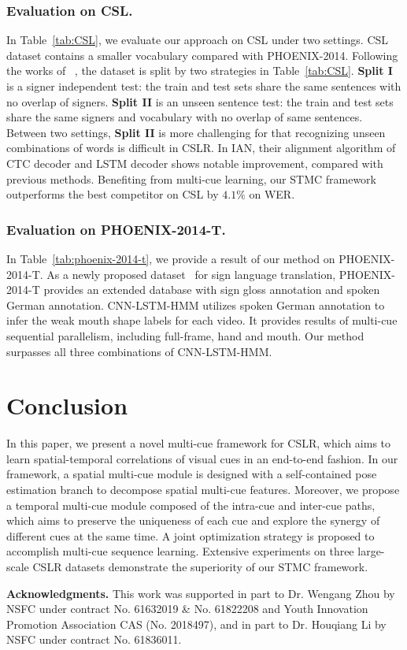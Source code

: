 \documentclass[letterpaper]{article} \usepackage{aaai20}  \usepackage{times}  \usepackage{helvet} \usepackage{courier}  \usepackage[hyphens]{url}  \usepackage{graphicx} \urlstyle{rm} \def\UrlFont{\rm}  \usepackage{graphicx}  \frenchspacing  \setlength{\pdfpagewidth}{8.5in}  \setlength{\pdfpageheight}{11in}
\begin{document}
\subsubsection{Evaluation on CSL.} In Table~\ref{tab:CSL}, we evaluate our approach on CSL under two settings. CSL dataset contains a smaller vocabulary compared with PHOENIX-2014. Following the works of ~\cite{han,hlstm}, the dataset is split by two strategies in Table~\ref{tab:CSL}. \textbf{Split I} is a signer independent test: the train and test sets share the same sentences with no overlap of signers. \textbf{Split II} is an unseen sentence test: the train and test sets share the same signers and vocabulary with no overlap of same sentences. Between two settings, \textbf{Split II} is more challenging for that recognizing unseen combinations of words is difficult in CSLR. In IAN, their alignment algorithm of CTC decoder and LSTM decoder shows notable improvement, compared with previous methods. Benefiting from multi-cue learning, our STMC framework outperforms the best competitor on CSL by $4.1\%$ on WER.

\subsubsection{Evaluation on PHOENIX-2014-T.} In Table~\ref{tab:phoenix-2014-t}, we provide a result of our method on PHOENIX-2014-T. As a newly proposed dataset~\cite{phoenix2014t} for sign language translation, PHOENIX-2014-T provides an extended database with sign gloss annotation and spoken German annotation. CNN-LSTM-HMM utilizes spoken German annotation to infer the weak mouth shape labels for each video. It provides results of multi-cue sequential parallelism, including full-frame, hand and mouth. Our method surpasses all three combinations of CNN-LSTM-HMM.

\section{Conclusion}
In this paper, we present a novel multi-cue framework for CSLR, which aims to learn spatial-temporal correlations of visual cues in an end-to-end fashion. In our framework, a spatial multi-cue module is designed with a self-contained pose estimation branch to decompose spatial multi-cue features. Moreover, we propose a temporal multi-cue module composed of the intra-cue and inter-cue paths, which aims to preserve the uniqueness of each cue and explore the synergy of different cues at the same time. A joint optimization strategy is proposed to accomplish multi-cue sequence learning. Extensive experiments on three large-scale CSLR datasets demonstrate the superiority of our STMC framework.

{\bf Acknowledgments.} This work was supported in part to Dr. Wengang Zhou by NSFC under contract No. 61632019 \& No. 61822208 and Youth Innovation Promotion Association CAS (No. 2018497), and in part to Dr. Houqiang Li by NSFC under contract No. 61836011. 

{
\begin{spacing}{0.94}

\footnotesize



    
\end{spacing}
}
\end{document}
